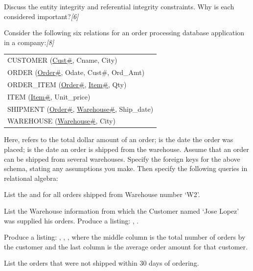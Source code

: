 \documentclass[11pt,a4paper]{article}
\newcommand{\pts}[1]{\hfill   \textit{[#1]}}
\begin{document}
\begin{parts}
  \item Discuss the entity integrity and referential integrity constraints. Why is each considered important?\pts{6}
  \item Consider the following six relations for an order processing database application in a company:\pts{8}
  
\begin{center}
    
\begin{tabular}{l}
      CUSTOMER (\underline{Cust\#}, Cname, City) \\
      ORDER (\underline{Order\#}, Odate, Cust\#, Ord\_Amt) \\
      ORDER\_ITEM (\underline{Order\#}, \underline{Item\#}, Qty) \\
      ITEM (\underline{Item\#}, Unit\_price) \\
      SHIPMENT (\underline{Order\#}, \underline{Warehouse\#}, Ship\_date) \\
      WAREHOUSE (\underline{Warehouse\#}, City)
    \end{tabular}
  \end{center}
  Here,   refers to the total dollar amount of an order;   is the date the order was placed;   is the date an order is shipped from the warehouse. Assume that an order can be shipped from several warehouses. Specify the foreign keys for the above schema, stating any assumptions you make. Then specify the following queries in relational algebra:
  
\begin{parts}
    \item List the   and   for all orders shipped from Warehouse number `W2'.
    \item List the Warehouse information from which the Customer named `Jose Lopez' was supplied his orders. Produce a listing:  ,  .
    \item Produce a listing:  ,  ,  , where the middle column is the total number of orders by the customer and the last column is the average order amount for that customer.
    \item List the orders that were not shipped within 30 days of ordering.
  \end{parts}
\end{parts}
\end{document}
